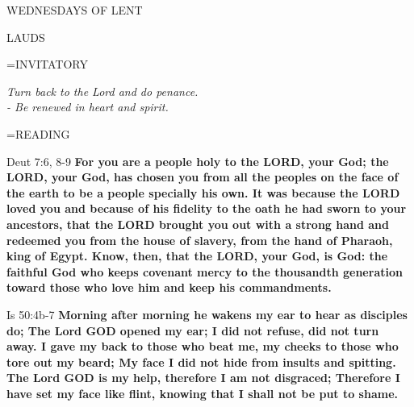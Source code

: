 \begin{center}
\normalsize \begin{center}\normalsize WEDNESDAYS OF LENT\\
\end{center}
\end{center}

\begin{flushleft}\normalsize LAUDS\\\end{flushleft}

\hangindent=\parindent \small{INVITATORY}
\begin{center}
\textit{Turn back to the Lord and do penance.\\}
\textit{- Be renewed in heart and spirit.\\}
\end{center}

\hangindent=\parindent \small READING
\begin{description}[labelindent=\parindent, leftmargin=*]
\item [Ash Wednesday \& Weeks 1-4:]     Deut 7:6, 8-9 \textbf{    For you are a people holy to the LORD, your God; the LORD, your God, has chosen you from all the peoples on the face of the earth to be a people specially his own. It was because the LORD loved you and because of his fidelity to the oath he had sworn to your ancestors, that the LORD brought you out with a strong hand and redeemed you from the house of slavery, from the hand of Pharaoh, king of Egypt. Know, then, that the LORD, your God, is God: the faithful God who keeps covenant mercy to the thousandth generation toward those who love him and keep his commandments.}
\item [Week 5:]     Is 50:4b-7 \textbf{    Morning after morning he wakens my ear to hear as disciples do; The Lord GOD opened my ear; I did not refuse, did not turn away. I gave my back to those who beat me, my cheeks to those who tore out my beard; My face I did not hide from insults and spitting. The Lord GOD is my help, therefore I am not disgraced; Therefore I have set my face like flint, knowing that I shall not be put to shame.}
\end{description}

